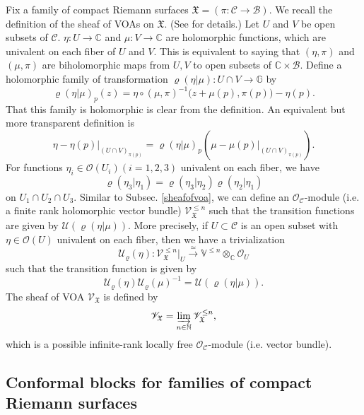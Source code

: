 \documentclass[11pt,b5paper,notitlepage]{article}
\theoremstyle{definition}
\theoremstyle{plain}
\newcommand{\mc}{\mathcal}
\newcommand{\SV}{\mathscr{V}}
\newcommand{\Vbb}{\mathbb V}
\newcommand{\Gbb}{\mathbb G}
\newcommand{\Cbb}{\mathbb C}
\newcommand{\Nbb}{\mathbb N}
\newcommand{\<}{\left\langle}
\renewcommand{\>}{\right\rangle}
\newcommand{\MO}{\mathcal{O}}
\newcommand{\MU}{\mathcal{U}}
\newcommand{\MC}{\mathcal{C}}
\newcommand{\MB}{\mathcal{B}}
\newcommand{\fx}{\mathfrak{X}}
\numberwithin{equation}{section}
\begin{document}
Fix a family of compact Riemann surfaces $\fx=(\pi:\MC\rightarrow \MB)$. We recall the definition of the sheaf of VOAs on $\fx$. (See \cite[Sec. 5]{Gui-sewingconvergence} for details.) Let $U$ and $V$ be open subsets of $\MC$. $\eta:U\rightarrow \Cbb$ and $\mu:V\rightarrow \Cbb$ are holomorphic functions, which are univalent on each fiber of $U$ and $V$. This is equivalent to saying that $(\eta,\pi)$ and $(\mu,\pi)$ are biholomorphic maps from $U,V$ to open subsets of $\Cbb\times \MB$. Define a holomorphic family of transformation $\varrho(\eta\vert \mu):U\cap V\rightarrow \Gbb$ by 
$$
\varrho(\eta\vert \mu)_p(z)=\eta\circ (\mu,\pi)^{-1}\big(z+\mu(p),\pi(p)\big)-\eta(p).
$$
That this family is holomorphic is clear from the definition. An equivalent but more transparent definition is
$$
\eta-\eta(p)\vert_{(U\cap V)_{\pi(p)}}=\varrho(\eta\vert \mu)_p(\mu-\mu(p)\vert_{(U\cap V)_{\pi(p)}}).
$$
For functions $\eta_i\in \MO(U_i)(i=1,2,3)$ univalent on each fiber, we have
$$
\varrho(\eta_3\vert \eta_1)=\varrho(\eta_3\vert \eta_2)\varrho(\eta_2\vert \eta_1)
$$
on $U_1\cap U_2\cap U_3$. Similar to Subsec. \ref{sheafofvoa}, we can define an $\mc O_{\mc C}$-module  (i.e. a finite rank holomorphic vector bundle) $\SV_{\fx}^{\leq n}$ such that the transition functions are given by $\MU(\varrho(\eta\vert \mu))$. More precisely, if $U\subset \MC$ is an open subset with $\eta\in \MO(U)$ univalent on each fiber, then we have a trivialization
$$
\MU_\varrho(\eta):\SV_\fx^{\leq n}\vert_{U}\xrightarrow{\simeq }\Vbb^{\leq n}\otimes_{\Cbb} \MO_U
$$
such that the transition function is given by
$$
\MU_\varrho(\eta)\MU_\varrho(\mu)^{-1}=\MU(\varrho(\eta\vert \mu)).
$$
The sheaf of VOA $\SV_\fx$ is defined by 
$$
\SV_\fx=\varinjlim_{n\in \Nbb} \SV_\fx^{\leq n},
$$
which is a possible infinite-rank locally free $\mc O_{\mc C}$-module (i.e. vector bundle).




\subsection{Conformal blocks for families of compact Riemann surfaces}
\end{document}
